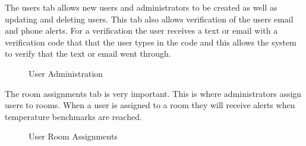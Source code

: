 \documentclass{report}
\begin{document}
The users tab allows new users and administrators to be created as well as updating and deleting users. This tab also allows verification of the users email and phone alerts. For a verification the user receives a text or email with a verification code that that the user types in the code and this allows the system to verify that the text or email went through.
\begin{figure}[H]
	\caption{User Administration}
\end{figure}
\newpage

The room assignments tab is very important. This is where administrators assign users to rooms. When a user is assigned to a room they will receive alerts when temperature benchmarks are reached.
\begin{figure}[H]
	\caption{User Room Assignments}
\end{figure}
\newpage
\end{document}
